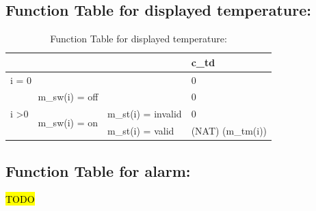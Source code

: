 \documentclass[fontsize=12pt,paper=letter,twoside]{scrartcl}
\begin{document}
\subsection{Function Table for displayed temperature: }
\begin{table}[]
\centering
\label{my-label}
\begin{tabular}{lll|l|}
\cline{4-4}
                                                        &                                                     &                    & c\_td            \\ \hline
\multicolumn{3}{|l|}{i = 0}                                                                                                        & 0                \\ \hline
\multicolumn{1}{|l|}{\multirow{3}{*}{i \textgreater 0}} & \multicolumn{2}{l|}{m\_sw(i) = off}                                      & 0                \\ \cline{2-4}
\multicolumn{1}{|l|}{}                                  & \multicolumn{1}{l|}{\multirow{2}{*}{m\_sw(i) = on}} & m\_st(i) = invalid & 0                \\ \cline{3-4}
\multicolumn{1}{|l|}{}                                  & \multicolumn{1}{l|}{}                               & m\_st(i) = valid   & (NAT) (m\_tm(i)) \\ \hline
\end{tabular}
\caption{Function Table for displayed temperature: }
\end{table}

\subsection{Function Table for alarm: }
\hl{TODO}
\end{document}
